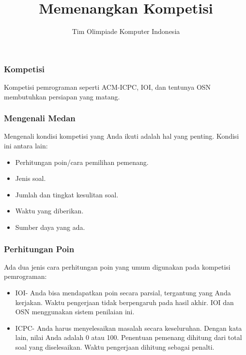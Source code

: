  

\title{Memenangkan Kompetisi}
\author{Tim Olimpiade Komputer Indonesia}
\date{}



\begin{frame}
  \titlepage
\end{frame}

  
\begin{frame}
  \frametitle{Kompetisi}
  Kompetisi pemrograman seperti ACM-ICPC, IOI, dan tentunya OSN membutuhkan persiapan yang matang.
\end{frame}

\begin{frame}
  \frametitle{Mengenali Medan}
  Mengenali kondisi kompetisi yang Anda ikuti adalah hal yang penting. Kondisi ini antara lain:
  \begin{itemize}
    \item Perhitungan poin/cara pemilihan pemenang.
    \item Jenis soal.
    \item Jumlah dan tingkat kesulitan soal.
    \item Waktu yang diberikan.
    \item Sumber daya yang ada.
  \end{itemize}
\end{frame}


\begin{frame}
  \frametitle{Perhitungan Poin}
  Ada dua jenis cara perhitungan poin yang umum digunakan pada kompetisi pemrograman:
  \begin{itemize}
    \item IOI-\newline
     Anda bisa mendapatkan poin secara parsial, tergantung  yang Anda kerjakan. Waktu pengerjaan tidak berpengaruh pada hasil akhir. IOI dan OSN menggunakan sistem penilaian ini.
    
    \item ICPC-\newline
    Anda harus menyelesaikan masalah secara keseluruhan. Dengan kata lain, nilai Anda adalah 0 atau 100. Penentuan pemenang dihitung dari total soal yang diselesaikan.  Waktu pengerjaan dihitung sebagai penalti.
  \end{itemize}
\end{frame}

